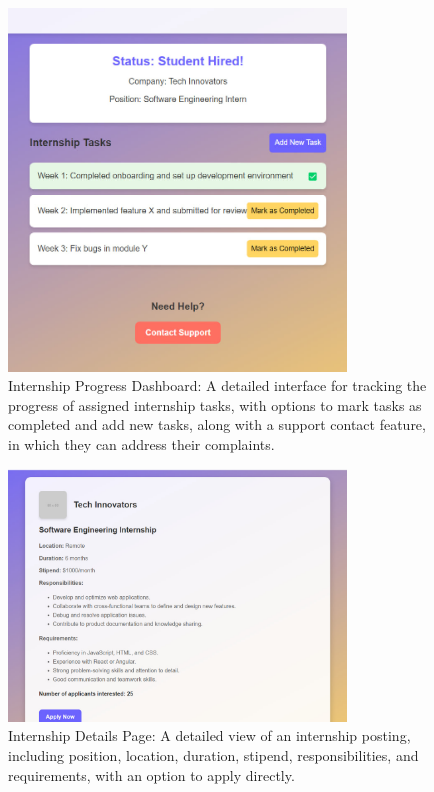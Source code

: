 \begin{figure}[H]
\centering
\includegraphics[width=0.8\textwidth]{Images/9.jpg}
\caption{\label{fig:metamodel9}Internship Progress Dashboard: A detailed interface for tracking the progress of assigned internship tasks, with options to mark tasks as completed and add new tasks, along with a support contact feature, in which they can address their complaints.}
\end{figure}

\begin{figure}[H]
\centering
\includegraphics[width=0.8\textwidth]{Images/10.jpg}
\caption{\label{fig:metamodel10}Internship Details Page: A detailed view of an internship posting, including position, location, duration, stipend, responsibilities, and requirements, with an option to apply directly.}
\end{figure}

